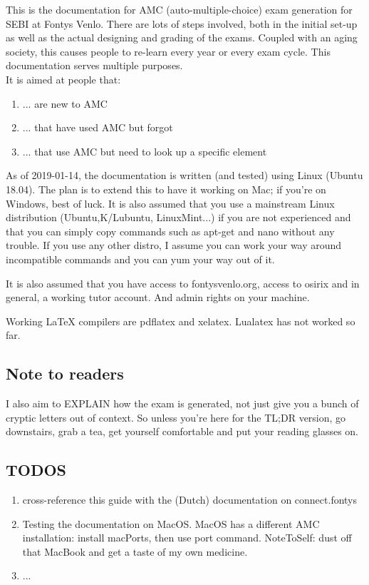 \documentclass{article}
\begin{document}
This is the documentation for AMC (auto-multiple-choice) exam generation for SEBI at Fontys Venlo. There are lots of steps involved, both in the initial set-up as well as the actual designing and grading of the exams. Coupled with an aging society, this causes people to re-learn every year or every exam cycle. This documentation serves multiple purposes. \\It is aimed at people that:
\begin{enumerate}
	\item ... are new to AMC
	\item ... that have used AMC but forgot
	\item ... that use AMC but need to look up a specific element
\end{enumerate}

As of 2019-01-14, the documentation is written (and tested) using Linux (Ubuntu 18.04). The plan is to extend this to have it working on Mac; if you're on Windows, best of luck. It is also assumed that you use a mainstream Linux distribution (Ubuntu,K/Lubuntu, LinuxMint...) if you are not experienced and that you can simply copy commands such as apt-get and nano without any trouble. If you use any other distro, I assume you can work your way around incompatible commands and you can yum your way out of it.

It is also assumed that you have access to fontysvenlo.org, access to  osirix and in general, a working tutor account. And admin rights on your machine.

Working LaTeX compilers are pdflatex and xelatex. Lualatex has not worked so far.
\subsection{Note to readers}
I also aim to EXPLAIN how the exam is generated, not just give you a bunch of cryptic letters out of context. So unless you're here for the TL;DR version, go downstairs, grab a tea, get yourself comfortable and put your reading glasses on.
\subsection{TODOS}
\begin{enumerate}
\item cross-reference this guide with the (Dutch) documentation on connect.fontys
\item Testing the documentation on MacOS.
MacOS has a different AMC installation: install macPorts, then use port command. NoteToSelf: dust off that MacBook and get a taste of my own medicine.
 \item ...
\end{enumerate}
\end{document}

